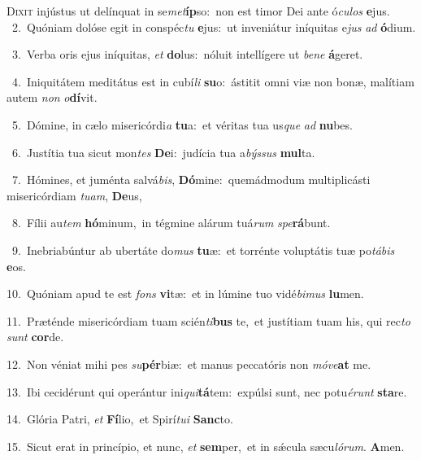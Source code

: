 \lettrine{\initial\textcolor{\initialcolor}{D}}{ixit} injústus ut delínquat in se\-\textit{met}\-\textbf{íp}so:~\star non est timor Dei ante ó\-\textit{cu}\-\textit{los} \textbf{e}\-jus.\\
{\numbfont\textcolor{\numbcolor}{~2.}}~Quóniam dolóse egit in conspéc\textit{tu} \textbf{e}\-jus:~\star ut inveniátur iníquitas e\textit{jus} \textit{ad} \textbf{ó}\-dium.\par
{\numbfont\textcolor{\numbcolor}{~3.}}~Verba oris ejus iníquitas, \textit{et} \textbf{do}\-lus:~\star nóluit intellígere ut \textit{be}\-\textit{ne} \textbf{á}\-geret.\par
{\numbfont\textcolor{\numbcolor}{~4.}}~Iniquitátem meditátus est in cubí\textit{li} \textbf{su}\-o:~\star ástitit omni viæ non bonæ, malítiam autem \textit{non} \textit{o}\-\textbf{dí}vit.\par
{\numbfont\textcolor{\numbcolor}{~5.}}~Dómine, in cælo misericórdi\textit{a} \textbf{tu}\-a:~\star et véritas tua us\textit{que} \textit{ad} \textbf{nu}\-bes.\par
{\numbfont\textcolor{\numbcolor}{~6.}}~Justítia tua sicut mon\textit{tes} \textbf{De}\-i:~\star judícia tua a\-\textit{býs}\-\textit{sus} \textbf{mul}\-ta.\par
{\numbfont\textcolor{\numbcolor}{~7.}}~Hómines, et juménta salvá\-\textit{bis}\-, \textbf{Dó}\-mine:~\star quemádmodum multiplicásti misericórdiam \textit{tu}\-\textit{am}, \textbf{De}\-us,\par
{\numbfont\textcolor{\numbcolor}{~8.}}~Fílii au\textit{tem} \textbf{hó}\-minum,~\star in tégmine alárum tuá\textit{rum} \textit{spe}\-\textbf{rá}bunt.\par
{\numbfont\textcolor{\numbcolor}{~9.}}~Inebriabúntur ab ubertáte do\textit{mus} \textbf{tu}\-æ:~\star et torrénte voluptátis tuæ po\-\textit{tá}\-\textit{bis} \textbf{e}\-os.\par
{\numbfont\textcolor{\numbcolor}{10.}}~Quóniam apud te est \textit{fons} \textbf{vi}\-tæ:~\star et in lúmine tuo vidé\-\textit{bi}\-\textit{mus} \textbf{lu}\-men.\par
{\numbfont\textcolor{\numbcolor}{11.}}~Præténde misericórdiam tuam scién\-\textit{ti}\-\textbf{bus} te,~\star et justítiam tuam his, qui rec\textit{to} \textit{sunt} \textbf{cor}\-de.\par
{\numbfont\textcolor{\numbcolor}{12.}}~Non véniat mihi pes \textit{su}\-\textbf{pér}biæ:~\star et manus peccatóris non \textit{mó}\-\textit{ve}\textbf{at} me.\par
{\numbfont\textcolor{\numbcolor}{13.}}~Ibi cecidérunt qui operántur ini\-\textit{qui}\-\textbf{tá}tem:~\star expúlsi sunt, nec potu\-\textit{é}\-\textit{runt} \textbf{sta}\-re.\par
{\numbfont\textcolor{\numbcolor}{14.}}~Glória Patri, \textit{et} \textbf{Fí}\-lio,~\star et Spirí\-\textit{tu}\-\textit{i} \textbf{Sanc}\-to.\par
{\numbfont\textcolor{\numbcolor}{15.}}~Sicut erat in princípio, et nunc, \textit{et} \textbf{sem}\-per,~\star et in sǽcula sæcu\-\textit{ló}\-\textit{rum}. \textbf{A}\-men.\par
